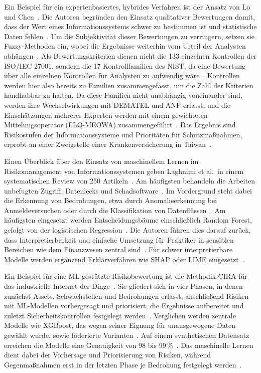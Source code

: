 Ein Beispiel für ein expertenbasiertes, hybrides Verfahren ist der Ansatz von Lo und Chen~\cite[S.~247]{Lo2012}.
Die Autoren begründen den Einsatz qualitativer Bewertungen damit, dass der Wert eines Informationssystems schwer zu bestimmen ist und statistische Daten fehlen~\cite[S.~247]{Lo2012}.
Um die Subjektivität dieser Bewertungen zu verringern, setzen sie Fuzzy-Methoden ein, wobei die Ergebnisse weiterhin vom Urteil der Analysten abhängen~\cite[S.~247--248]{Lo2012}.
Als Bewertungskriterien dienen nicht die 133 einzelnen Kontrollen der ISO/IEC 27001, sondern die 17 Kontrollfamilien des NIST, da eine Bewertung über alle einzelnen Kontrollen für Analysten zu aufwendig wäre~\cite[S.~248--249]{Lo2012}.
Kontrollen werden hier also bereits zu Familien zusammengefasst, um die Zahl der Kriterien handhabbar zu halten.
Da diese Familien nicht unabhängig voneinander sind, werden ihre Wechselwirkungen mit DEMATEL und ANP erfasst, und die Einschätzungen mehrerer Experten werden mit einem gewichteten Mittelungsoperator (FLQ-MEOWA) zusammengeführt~\cite[S.~248]{Lo2012}.
Das Ergebnis sind Risikostufen der Informationssysteme und Prioritäten für Schutzmaßnahmen, erprobt an einer Zweigstelle einer Krankenversicherung in Taiwan~\cite[S.~247, 254]{Lo2012}.

Einen Überblick über den Einsatz von maschinellem Lernen im Risikomanagement von Informationssystemen geben Laghnimi et al.\ in einem systematischen Review von 250 Artikeln~\cite[S.~1]{Laghnimi2026}.
Am häufigsten behandeln die Arbeiten unbefugten Zugriff, Datenlecks und Schadsoftware~\cite[S.~1]{Laghnimi2026}.
Im Vordergrund steht dabei die Erkennung von Bedrohungen, etwa durch Anomalieerkennung bei Anmeldeversuchen oder durch die Klassifikation von Datenflüssen~\cite[S.~8]{Laghnimi2026}.
Am häufigsten eingesetzt werden Entscheidungsbäume einschließlich Random Forest, gefolgt von der logistischen Regression~\cite[S.~5]{Laghnimi2026}.
Die Autoren führen dies darauf zurück, dass Interpretierbarkeit und einfache Umsetzung für Praktiker in sensiblen Bereichen wie dem Finanzwesen zentral sind~\cite[S.~5, 8]{Laghnimi2026}.
Für schwer interpretierbare Modelle werden ergänzend Erklärverfahren wie SHAP oder LIME eingesetzt~\cite[S.~5]{Laghnimi2026}.

Ein Beispiel für eine ML-gestützte Risikobewertung ist die Methodik CIRA für das industrielle Internet der Dinge~\cite[S.~77001]{Abbas2025}.
Sie gliedert sich in vier Phasen, in denen zunächst Assets, Schwachstellen und Bedrohungen erfasst, anschließend Risiken mit ML-Modellen vorhergesagt und priorisiert, die Ergebnisse aufbereitet und zuletzt Sicherheitskontrollen festgelegt werden~\cite[S.~77005]{Abbas2025}.
Verglichen werden zentrale Modelle wie XGBoost, das wegen seiner Eignung für unausgewogene Daten gewählt wurde, sowie föderierte Varianten~\cite[S.~77001, 77005]{Abbas2025}.
Auf einem synthetischen Datensatz erreichen die Modelle eine Genauigkeit von 98 bis 99\,\%~\cite[S.~77001]{Abbas2025}.
Das maschinelle Lernen dient dabei der Vorhersage und Priorisierung von Risiken, während Gegenmaßnahmen erst in der letzten Phase je Bedrohung festgelegt werden~\cite[S.~77005, 77014]{Abbas2025}.

